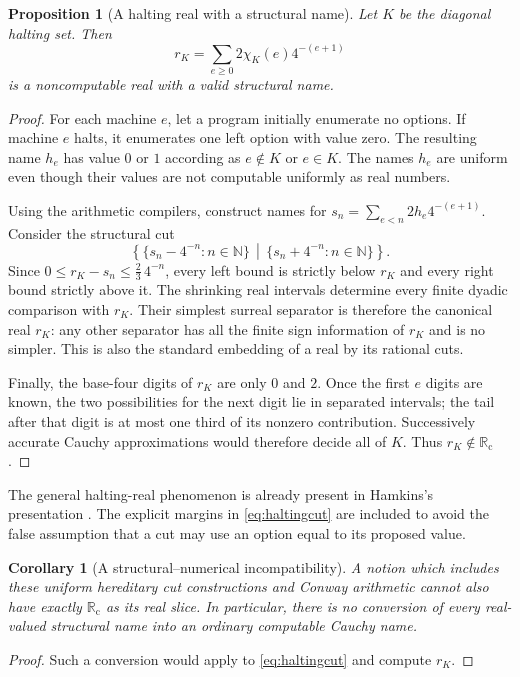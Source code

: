 \documentclass[11pt,letterpaper]{article}
\numberwithin{equation}{section}
\newtheorem{proposition}[theorem]{Proposition}
\newtheorem{corollary}[theorem]{Corollary}
\theoremstyle{definition}
\theoremstyle{remark}
\newcommand{\Rc}{\mathbb R_{\mathrm c}}
\newcommand{\N}{\mathbb N}
\newcommand{\cut}[2]{\left\{#1\,\middle|\,#2\right\}}
\begin{document}
\begin{proposition}[A halting real with a structural name]
\label{prop:haltingreal}
Let $K$ be the diagonal halting set. Then
\[
 r_K=\sum_{e\ge0}2\chi_K(e)4^{-(e+1)}
\]
is a noncomputable real with a valid structural name.
\end{proposition}
\begin{proof}
For each machine $e$, let a program initially enumerate no options. If
machine $e$ halts, it enumerates one left option with value zero. The resulting
name $h_e$ has value $0$ or $1$ according as $e\notin K$ or $e\in K$.
The names $h_e$ are uniform even though their values are not computable
uniformly as real numbers.

Using the arithmetic compilers, construct names for
$s_n=\sum_{e<n}2h_e4^{-(e+1)}$. Consider the structural cut
\begin{equation}\label{eq:haltingcut}
 \cut{\{s_n-4^{-n}:n\in\N\}}
      {\{s_n+4^{-n}:n\in\N\}}.
\end{equation}
Since $0\le r_K-s_n\le\tfrac23\,4^{-n}$, every left bound is strictly
below $r_K$ and every right bound strictly above it. The shrinking real
intervals determine every finite dyadic comparison with $r_K$. Their
simplest surreal separator is therefore the canonical real $r_K$: any
other separator has all the finite sign information of $r_K$ and is no
simpler. This is also the standard embedding of a real by its rational cuts.

Finally, the base-four digits of $r_K$ are only $0$ and $2$. Once the first
$e$ digits are known, the two possibilities for the next digit lie in
separated intervals; the tail after that digit is at most one third of its
nonzero contribution. Successively accurate Cauchy approximations would
therefore decide all of $K$. Thus $r_K\notin\Rc$.
\end{proof}

The general halting-real phenomenon is already present in Hamkins's
presentation \cite{hamkins}. The explicit margins in
\eqref{eq:haltingcut} are included to avoid the false assumption that a cut
may use an option equal to its proposed value.

\begin{corollary}[A structural--numerical incompatibility]
A notion which includes these uniform hereditary cut constructions and
Conway arithmetic cannot also have exactly $\Rc$ as its real slice. In
particular, there is no conversion of every real-valued structural name
into an ordinary computable Cauchy name.
\end{corollary}
\begin{proof}
Such a conversion would apply to \eqref{eq:haltingcut} and compute $r_K$.
\end{proof}
\end{document}
